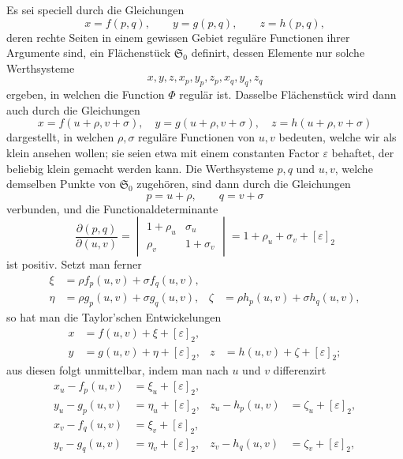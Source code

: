 \documentclass[11pt,a4paper,leqno]{article}
\begin{document}
Es sei speciell durch die Gleichungen
\[
x=f(p,q),\qquad y=g(p,q),\qquad z=h(p,q),
\]
deren rechte Seiten in einem gewissen Gebiet reguläre Functionen ihrer Argumente sind, ein Flächenstück $\mathfrak{S}_0$ definirt, dessen Elemente nur solche Werthsysteme
\[
x,y,z,x_p,y_p,z_p,x_q,y_q,z_q
\]
ergeben, in welchen die Function $\Phi$ regulär ist. Dasselbe Flächenstück wird dann auch durch die Gleichungen
\[
x=f(u+\rho,v+\sigma),\quad
y=g(u+\rho,v+\sigma),\quad
z=h(u+\rho,v+\sigma)
\]
dargestellt, in welchen $\rho,\sigma$ reguläre Functionen von $u,v$ bedeuten, welche wir als klein ansehen wollen; sie seien etwa mit einem constanten Factor $\varepsilon$ behaftet, der beliebig klein gemacht werden kann. Die Werthsysteme $p,q$ und $u,v$, welche demselben Punkte von $\mathfrak{S}_0$ zugehören, sind dann durch die Gleichungen
\[
p=u+\rho,\qquad q=v+\sigma
\]
verbunden, und die Functionaldeterminante
\[
\frac{\partial(p,q)}{\partial(u,v)}
=
\begin{vmatrix}
1+\rho_u & \sigma_u\\
\rho_v & 1+\sigma_v
\end{vmatrix}
=1+\rho_u+\sigma_v+[\varepsilon]_2
\]
ist positiv. Setzt man ferner
\[
\begin{aligned}
\xi&=\rho f_p(u,v)+\sigma f_q(u,v),\\
\eta&=\rho g_p(u,v)+\sigma g_q(u,v),
&\zeta&=\rho h_p(u,v)+\sigma h_q(u,v),
\end{aligned}
\]
so hat man die Taylor'schen Entwickelungen
\[
\begin{aligned}
x&=f(u,v)+\xi+[\varepsilon]_2,\\
y&=g(u,v)+\eta+[\varepsilon]_2,
&z&=h(u,v)+\zeta+[\varepsilon]_2;
\end{aligned}
\]
aus diesen folgt unmittelbar, indem man nach $u$ und $v$ differenzirt
\[
\begin{aligned}
x_u-f_p(u,v)&=\xi_u+[\varepsilon]_2,\\
y_u-g_p(u,v)&=\eta_u+[\varepsilon]_2,
&z_u-h_p(u,v)&=\zeta_u+[\varepsilon]_2,\\
x_v-f_q(u,v)&=\xi_v+[\varepsilon]_2,\\
y_v-g_q(u,v)&=\eta_v+[\varepsilon]_2,
&z_v-h_q(u,v)&=\zeta_v+[\varepsilon]_2,
\end{aligned}
\]
\end{document}
